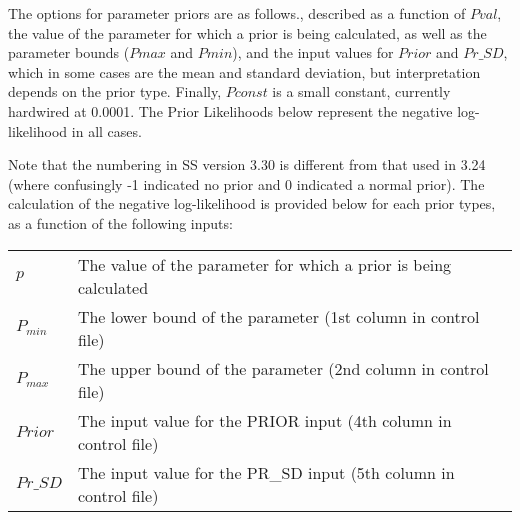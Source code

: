 The options for parameter priors are as follows., described as a function of $Pval$, the value of the parameter for which a prior is being calculated, as well as the parameter bounds ($Pmax$ and $Pmin$), and the input values for $Prior$ and $Pr\_SD$, which in some cases are the mean and standard deviation, but interpretation depends on the prior type. Finally, $Pconst$ is a small constant, currently hardwired at 0.0001. The Prior Likelihoods below represent the negative log-likelihood in all cases.


Note that the numbering in SS version 3.30 is different from that used in 3.24 (where confusingly -1 indicated no prior and 0 indicated a normal prior). The calculation of the negative log-likelihood is provided below for each prior types, as a function of the following inputs:

\begin{tabular}{ll}
  $p$       & The value of the parameter for which a prior is being calculated  \\
  $P_{min}$  & The lower bound of the parameter (1st column in control file)     \\
  $P_{max}$  & The upper bound of the parameter (2nd column in control file)     \\
  $Prior$   & The input value for the PRIOR input (4th column in control file)  \\
  $Pr\_SD$  & The input value for the PR\_SD input (5th column in control file) \\
\end{tabular}

